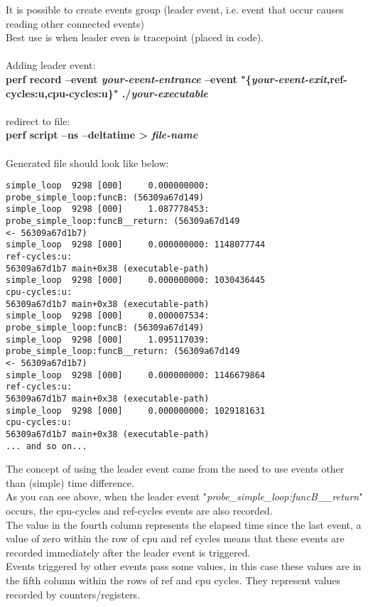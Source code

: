 \documentclass[11pt,onecolumn]{article}
\begin{document}
It is possible to create events group (leader event, i.e. event that occur causes reading other connected events)\\
Best use is when leader even is tracepoint (placed in code).\\\\
Adding leader event:\\
\textbf{perf record --event \textit{your-event-entrance} --event "\{\textit{your-event-exit},ref-cycles:u,cpu-cycles:u\}" ./\textit{your-executable}}\\\\
redirect to file:\\
\textbf{perf script --ns --deltatime > \textit{file-name}}\\\\
Generated file should look like below:
\begin{verbatim}
simple_loop  9298 [000]     0.000000000:         probe_simple_loop:funcB: (56309a67d149)
simple_loop  9298 [000]     1.087778453: probe_simple_loop:funcB__return: (56309a67d149
<- 56309a67d1b7)
simple_loop  9298 [000]     0.000000000: 1148077744                    ref-cycles:u:      
56309a67d1b7 main+0x38 (executable-path)
simple_loop  9298 [000]     0.000000000: 1030436445                    cpu-cycles:u:      
56309a67d1b7 main+0x38 (executable-path)
simple_loop  9298 [000]     0.000007534:         probe_simple_loop:funcB: (56309a67d149)
simple_loop  9298 [000]     1.095117039: probe_simple_loop:funcB__return: (56309a67d149
<- 56309a67d1b7)
simple_loop  9298 [000]     0.000000000: 1146679864                    ref-cycles:u:      
56309a67d1b7 main+0x38 (executable-path)
simple_loop  9298 [000]     0.000000000: 1029181631                    cpu-cycles:u:      
56309a67d1b7 main+0x38 (executable-path)
... and so on...
\end{verbatim}
The concept of using the leader event came from the need to use events other than (simple) time difference.\\
As you can see above, when the leader event "\textit{probe\_simple\_loop:funcB\_\_return}" occurs, the cpu-cycles and ref-cycles events are also recorded.\\
The value in the fourth column represents the elapsed time since the last event, a value of zero within the row of cpu and ref cycles means that these events are recorded immediately after the leader event is triggered.\\
Events triggered by other events pass some values, in this case these values are in the fifth column within the rows of ref and cpu cycles. They represent values recorded by counters/registers.
\end{document}
